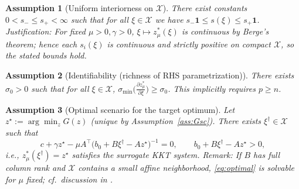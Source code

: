 \documentclass[11pt]{article}
\newtheorem{assumption}{Assumption}
\theoremstyle{remark}
\begin{document}
\begin{assumption}[Uniform interiorness on $\mathcal X$]
\label{ass:int}
There exist constants $0<s_-\le s_+<\infty$ such that for all $\xi\in\mathcal X$ we have $s_-\mathbf 1\le s(\xi)\le s_+\mathbf 1$.
\emph{Justification:} For fixed $\mu>0,\gamma>0$, $\xi\mapsto z^*_\mu(\xi)$ is continuous by Berge's theorem; hence each $s_i(\xi)$ is continuous and strictly positive on compact $\mathcal X$, so the stated bounds hold.
\end{assumption}

\begin{assumption}[Identifiability (richness of RHS parametrization)]
\label{ass:ident}
There exists $\sigma_0>0$ such that for all $\xi\in\mathcal X$, $\sigma_{\min}\!\Big(\frac{\partial z^*_\mu}{\partial \xi}\Big)\ge \sigma_0$.
This implicitly requires $p\ge n$.
\end{assumption}

\begin{assumption}[Optimal scenario for the target optimum]
\label{ass:optimal}
Let $z^\star:=\arg\min_z G(z)$ (unique by Assumption~\ref{ass:Gsc}). There exists $\xi^\dagger\in\mathcal X$ such that
\begin{equation}
\label{eq:optimal}
c+\gamma z^\star-\mu A^\top\big(b_0+B\xi^\dagger-A z^\star\big)^{-1}=0,\qquad b_0+B\xi^\dagger-A z^\star>0,
\end{equation}
i.e., $z^*_\mu(\xi^\dagger)=z^\star$ satisfies the surrogate KKT system.
\emph{Remark:} If $B$ has full column rank and $\mathcal X$ contains a small affine neighborhood, \eqref{eq:optimal} is solvable for $\mu$ fixed; cf.\ discussion in \cite{FOTB,DFS}. 
\end{assumption}
\end{document}
